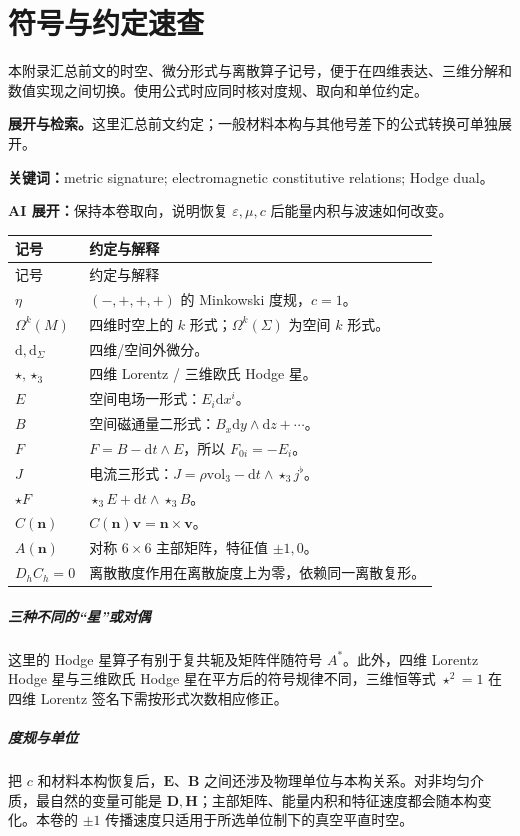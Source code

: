 \documentclass[UTF8,11pt,openany]{ctexbook}
\numberwithin{equation}{chapter}
\theoremstyle{definition}
\theoremstyle{remark}
\newcommand{\dd}{\mathrm d}
\newcommand{\vol}{\mathrm{vol}}
\newcommand{\starS}{\star_3}
\newcommand{\studyroute}[3]{%
  \par\smallskip\noindent\textbf{展开与检索。}#1\par
  \noindent\textbf{关键词：}#2。\par
  \noindent\textbf{AI 展开：}#3\par
}
\begin{document}
\chapter{符号与约定速查}
\begin{chaptersummary}
本附录汇总前文的时空、微分形式与离散算子记号，便于在四维表达、三维分解和数值实现之间切换。使用公式时应同时核对度规、取向和单位约定。
\end{chaptersummary}
\studyroute{这里汇总前文约定；一般材料本构与其他号差下的公式转换可单独展开。}{metric signature; electromagnetic constitutive relations; Hodge dual}{保持本卷取向，说明恢复 $\varepsilon,\mu,c$ 后能量内积与波速如何改变。}
\begin{longtable}{p{}p{}}
\toprule
记号 & 约定与解释\\
\midrule
\endfirsthead
\toprule
记号 & 约定与解释\\
\midrule
\endhead
$\eta$ & $(-,+,+,+)$ 的 Minkowski 度规，$c=1$。\\
$\Omega^k(M)$ & 四维时空上的 $k$ 形式；$\Omega^k(\Sigma)$ 为空间 $k$ 形式。\\
$\dd,\dd_\Sigma$ & 四维/空间外微分。\\
$\star,\starS$ & 四维 Lorentz / 三维欧氏 Hodge 星。\\
$E$ & 空间电场一形式：$E_i\dd x^i$。\\
$B$ & 空间磁通量二形式：$B_x\dd y\wedge\dd z+\cdots$。\\
$F$ & $F=B-\dd t\wedge E$，所以 $F_{0i}=-E_i$。\\
$J$ & 电流三形式：$J=\rho\vol_3-\dd t\wedge\starS j^\flat$。\\
$\star F$ & $\starS E+\dd t\wedge\starS B$。\\
$C(\bm n)$ & $C(\bm n)\bm v=\bm n\times\bm v$。\\
$A(\bm n)$ & 对称 $6\times6$ 主部矩阵，特征值 $\pm1,0$。\\
$D_hC_h=0$ & 离散散度作用在离散旋度上为零，依赖同一离散复形。\\
\bottomrule
\end{longtable}

\paragraph{三种不同的“星”或对偶}这里的 Hodge 星算子有别于复共轭及矩阵伴随符号 $A^*$。此外，四维 Lorentz Hodge 星与三维欧氏 Hodge 星在平方后的符号规律不同，三维恒等式 $\star^2=1$ 在四维 Lorentz 签名下需按形式次数相应修正。

\paragraph{度规与单位}把 $c$ 和材料本构恢复后，$\bm E$、$\bm B$ 之间还涉及物理单位与本构关系。对非均匀介质，最自然的变量可能是 $\bm D,\bm H$；主部矩阵、能量内积和特征速度都会随本构变化。本卷的 $\pm1$ 传播速度只适用于所选单位制下的真空平直时空。
\end{document}
